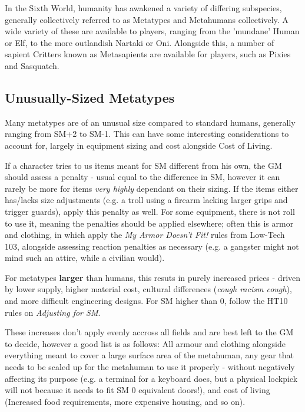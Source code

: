 
\begin{multicols*}{3}
	
	In the Sixth World, humanity has awakened a variety of differing subspecies, generally collectively referred to as Metatypes and Metahumans collectively. A wide variety of these are available to players, ranging from the 'mundane' Human or Elf, to the more outlandish Nartaki or Oni. Alongside this, a number of sapient Critters known as Metasapients are available for players, such as Pixies and Sasquatch.
	
	\subsection{Unusually-Sized Metatypes}\label{metatype_sizing}
	
	Many metatypes are of an unusual size compared to standard humans, generally ranging from SM+2 to SM-1. This can have some interesting considerations to account for, largely in equipment sizing and cost alongside Cost of Living.
	
	If a character tries to us items meant for SM different from his own, the GM should assess a penalty - usual equal to the difference in SM, however it can rarely be more for items \textit{very highly} dependant on their sizing. If the items either has/lacks size adjustments (e.g. a troll using a firearm lacking larger grips and trigger guards), apply this penalty as well. For some equipment, there is not roll to use it, meaning the penalties should be applied elsewhere; often this is armor and clothing, in which apply the \textit{My Armor Doesn't Fit!} rules from Low-Tech 103, alongside assessing reaction penalties as necessary (e.g. a gangster might not mind such an attire, while a civilian would).
	
	For metatypes \textbf{larger} than humans, this resuts in purely increased prices - driven by lower supply, higher material cost, cultural differences (\textit{cough racism cough}), and  more difficult engineering designs. For SM higher than 0, follow the HT10 rules on \textit{Adjusting for SM}.
	
	These increases don't apply evenly accross all fields and are best left to the GM to decide, however a good list is as follows: All armour and clothing alongside everything meant to cover a large surface area of the metahuman, any gear that needs to be scaled up for the metahuman to use it properly - without negatively affecting its purpose (e.g. a terminal for a keyboard does, but a physical lockpick will not because it needs to fit SM 0 equivalent doors!), and cost of living (Increased food requirements, more expensive housing, and so on).
	

\end{multicols*}
